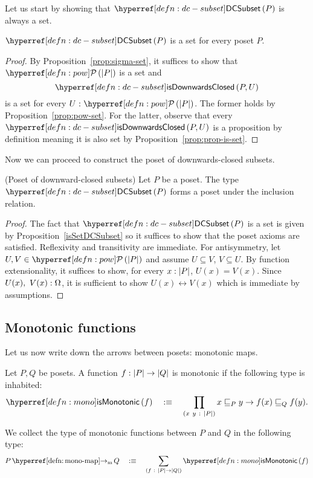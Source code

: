 Let us start by showing that $\dcsubset{P}$ is always a set.
\begin{prop}\label{isSetDCSubset}
  $\dcsubset{P}$ is a set for every poset $P$.
\end{prop}
\begin{proof}
  By Proposition~\ref{prop:sigma-set}, it suffices to show that $\pow{\abs{P}}$ is a set
  and $$\isdc{P, U}$$ is a set for every $\oftyI{U}{\pow{\abs{P}}}$. The former holds by
  Proposition~\ref{prop:pow-set}. For the latter, observe that every $\isdc{P, U}$ is a
  proposition by definition meaning it is also set by Proposition~\ref{prop:prop-is-set}.
\end{proof}

Now we can proceed to construct the poset of downwards-closed subsets.
\begin{prop}(Poset of downward-closed subsets)\label{prop:dc-poset}
  Let $P$ be a poset. The type $\dcsubset{P}$ forms a poset under the
  inclusion relation.
\end{prop}
\begin{proof}
  The fact that $\dcsubset{P}$ is a set is given by Proposition~\ref{isSetDCSubset} so it
  suffices to show that the poset axioms are satisfied. Reflexivity and transitivity are
  immediate. For antisymmetry, let $U, V \in \pow{\abs{P}}$ and assume $U \subseteq V$, $V \subseteq U$. By
  function extensionality, it suffices to show, for every $x : \left| P \right|$, $U(x) = V(x)$.
  Since $U(x),~V(x):\Omega$, it is sufficient to show $U(x) \leftrightarrow V(x)$ which is
  immediate by assumptions.
\end{proof}

\subsection{Monotonic functions}

Let us now write down the arrows between posets: monotonic maps.
\begin{defn}\label{defn:mono-map}
  Let $P, Q$ be posets. A function $f : \left| P \right| \rightarrow \left| Q \right|$ is monotonic if the following
  type is inhabited:
  \begin{equation*}
    \ismonotonic{f} \quad\is\quad \pity{x~y}{\abs{P}}{x \sqsubseteq_P y \rightarrow f(x) \sqsubseteq_Q f(y)}.
  \end{equation*}

  We collect the type of monotonic functions between $P$ and $Q$ in the following type:
  \begin{equation*}
    \mono{P}{Q} \quad\is\quad \sigmaty{f}{\abs{P} \rightarrow \abs{Q}}{\ismonotonic{f}}
  \end{equation*}
\end{defn}

